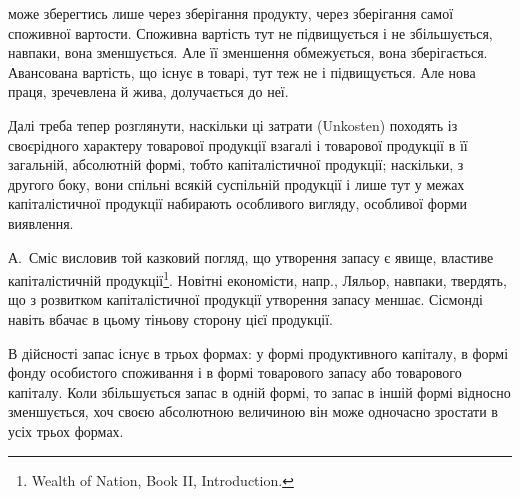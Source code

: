 \parcont{}  %
може зберегтись лише через зберігання продукту, через зберігання самої
споживної вартости. Споживна вартість тут не підвищується і не збільшується,
навпаки, вона зменшується. Але її зменшення обмежується,
вона зберігається. Авансована вартість, що існує в товарі, тут теж не
і підвищується. Але нова праця, зречевлена й жива, долучається до неї.

Далі треба тепер розглянути, наскільки ці затрати (Unkosten)
походять із своєрідного характеру товарової продукції взагалі і товарової
продукції в її загальній, абсолютній формі, тобто капіталістичної продукції;
наскільки, з другого боку, вони спільні всякій суспільній продукції і
лише тут у межах капіталістичної продукції набирають особливого вигляду,
особливої форми виявлення.

А.~Сміс висловив той казковий погляд, що утворення запасу є явище,
властиве капіталістичній продукції\footnote{
Wealth of Nation, Book II, Introduction.
}. Новітні економісти, напр., Ляльор,
навпаки, твердять, що з розвитком капіталістичної продукції утворення запасу
меншає. Сісмонді навіть вбачає в цьому тіньову сторону цієї продукції.

В дійсності запас існує в трьох формах: у формі продуктивного
капіталу, в формі фонду особистого споживання і в формі товарового
запасу або товарового капіталу. Коли збільшується запас в одній формі,
то запас в іншій формі відносно зменшується, хоч своєю абсолютною
величиною він може одночасно зростати в усіх трьох формах.

